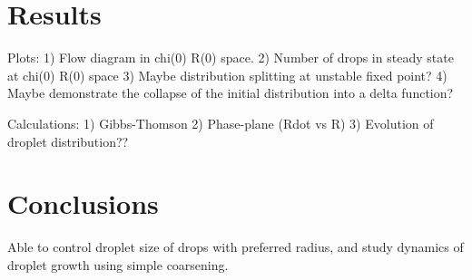 \documentclass[12pt]{article}
\begin{document}
\section{Results}

Plots:
1) Flow diagram in chi(0) R(0) space.
2) Number of drops in steady state at chi(0) R(0) space
3) Maybe distribution splitting at unstable fixed point?
4) Maybe demonstrate the collapse of the initial distribution into a delta function?

Calculations:
1) Gibbs-Thomson
2) Phase-plane (Rdot vs R)
3) Evolution of droplet distribution??

\section{Conclusions}
Able to control droplet size of drops with preferred radius, and study dynamics of droplet growth using simple coarsening.

\clearpage


\end{document}
